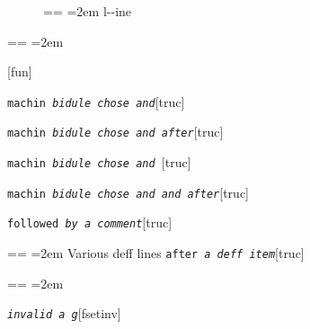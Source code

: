\documentclass{book}
\makeatletter
\newcommand\GNUTexinfocommandstyletextvar[1]{{\normalfont{}\textsl{#1}}}%
\newenvironment{GNUTexinfopreformatted}{%
  \par\obeylines\obeyspaces\frenchspacing
  \parskip=\z@\parindent=\z@}{}
\makeatother
\begin{document}
\begin{description}
\item[{\parbox[b]{\linewidth}{%
a\\
\index[fn]{a@\texttt{a}}%
\index[cp]{index entry between item and itemx}%
b
\index[fn]{b@\texttt{b}}%
}}]
\begin{GNUTexinfopreformatted}
\leftskip=2em\relax\ttfamily%
l{-}{-}ine
\end{GNUTexinfopreformatted}
\end{description}
\begin{GNUTexinfopreformatted}
\leftskip=2em\relax\ttfamily%

\end{GNUTexinfopreformatted}
\noindent\texttt{}\hfill[fun]



\noindent\texttt{machin \EmbracOn{}\textnormal{\textsl{bidule chose and}}\EmbracOff{}}\hfill[truc]



%
\noindent\texttt{machin \EmbracOn{}\textnormal{\textsl{bidule chose and  after}}\EmbracOff{}}\hfill[truc]



%
\noindent\texttt{machin \EmbracOn{}\textnormal{\textsl{bidule chose and }}\EmbracOff{}}\hfill[truc]



%
\noindent\texttt{machin \EmbracOn{}\textnormal{\textsl{bidule chose and and after}}\EmbracOff{}}\hfill[truc]



%
\noindent\texttt{followed \EmbracOn{}\textnormal{\textsl{by a comment}}\EmbracOff{}}\hfill[truc]



%
\begin{GNUTexinfopreformatted}
\leftskip=2em\relax\ttfamily%
Various deff lines
\end{GNUTexinfopreformatted}
\noindent\texttt{after \EmbracOn{}\textnormal{\textsl{a deff item}}\EmbracOff{}}\hfill[truc]



%
\begin{GNUTexinfopreformatted}
\leftskip=2em\relax\ttfamily%

\end{GNUTexinfopreformatted}
\noindent\texttt{\GNUTexinfocommandstyletextvar{invalid} \EmbracOn{}\textnormal{\textsl{a g}}\EmbracOff{}}\hfill[fsetinv]
\end{document}
